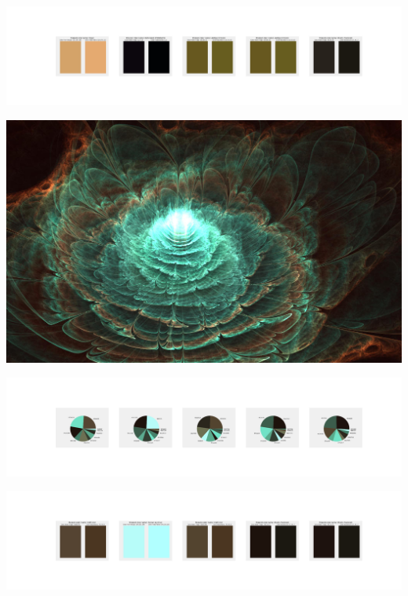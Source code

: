 \documentclass[11pt]{article}
\begin{document}
\begin{landscape}
    \begin{center}
    \includegraphics[width=250mm]{./nbimg/peak-410.jpg}
    \end{center}
    

    \begin{center}
    \includegraphics[width=\textwidth]{./nbimg/file (63).jpg}
    \end{center}

    \begin{center}
    \includegraphics[width=250mm]{./nbimg/pie-411.jpg}
    \end{center}

    \begin{center}
    \includegraphics[width=250mm]{./nbimg/peak-411.jpg}
    \end{center}
    


\end{landscape}
\end{document}
